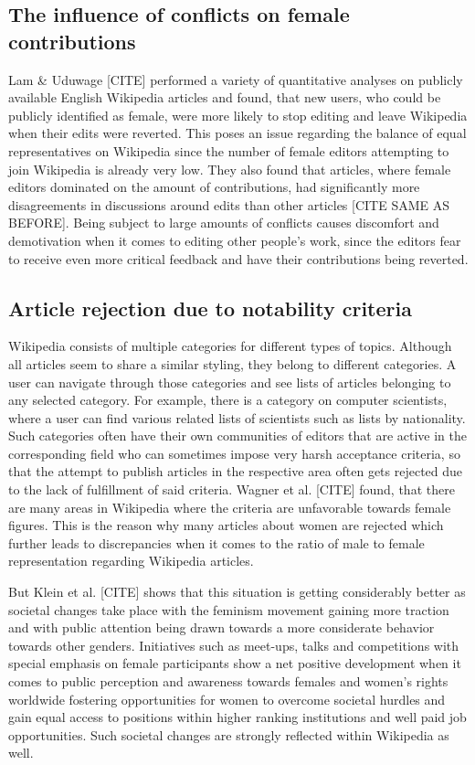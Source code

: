 \documentclass[a4paper, 11pt]{article}
\begin{document}
\subsection{The influence of conflicts on female contributions} \label{sec:gender-gap-wikipedia:conflicts}
Lam \& Uduwage [CITE] performed a variety of quantitative analyses on publicly available English Wikipedia articles and found, that new users, who could be publicly identified as female, were more likely to stop editing and leave Wikipedia when their edits were reverted. This poses an issue regarding the balance of equal representatives on Wikipedia since the number of female editors attempting to join Wikipedia is already very low. They also found that articles, where female editors dominated on the amount of contributions, had significantly more disagreements in discussions around edits than other articles [CITE SAME AS BEFORE]. Being subject to large amounts of conflicts causes discomfort and demotivation when it comes to editing other people’s work, since the editors fear to receive even more critical feedback and have their contributions being reverted.

\subsection{Article rejection due to notability criteria} \label{sec:gender-gap-wikipedia:notability}
Wikipedia consists of multiple categories for different types of topics. Although all articles seem to share a similar styling, they belong to different categories. A user can navigate through those categories and see lists of articles belonging to any selected category. For example, there is a category on computer scientists, where a user can find various related lists of scientists such as lists by nationality. Such categories often have their own communities of editors that are active in the corresponding field who can sometimes impose very harsh acceptance criteria, so that the attempt to publish articles in the respective area often gets rejected due to the lack of fulfillment of said criteria. Wagner et al. [CITE] found, that there are many areas in Wikipedia where the criteria are unfavorable towards female figures. This is the reason why many articles about women are rejected which further leads to discrepancies when it comes to the ratio of male to female representation regarding Wikipedia articles.

But Klein et al. [CITE] shows that this situation is getting considerably better as societal changes take place with the feminism movement gaining more traction and with public attention being drawn towards a more considerate behavior towards other genders. Initiatives such as meet-ups, talks and competitions with special emphasis on female participants show a net positive development when it comes to public perception and awareness towards females and women’s rights worldwide fostering opportunities for women to overcome societal hurdles and gain equal access to positions within higher ranking institutions and well paid job opportunities. Such societal changes are strongly reflected within Wikipedia as well.
\end{document}
